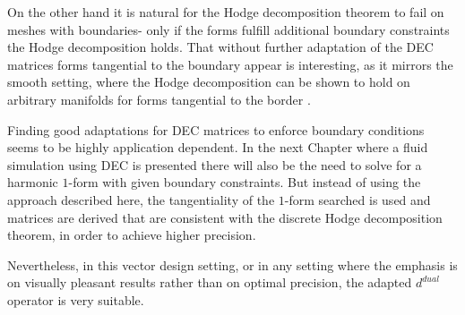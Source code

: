 On the other hand it is natural for the Hodge decomposition theorem to fail on meshes with boundaries- only if the forms fulfill additional boundary constraints the Hodge decomposition holds. That without further adaptation  of the DEC matrices forms tangential to the boundary appear is interesting, as it mirrors the smooth setting, where the Hodge decomposition can be shown to hold on arbitrary manifolds for forms tangential to the border \cite{FRANKEL11}. 

Finding good adaptations for DEC matrices to enforce boundary conditions seems to be highly application dependent.
In the next Chapter where a fluid simulation using DEC is presented there will also be the need to solve for a harmonic $1$-form with given boundary constraints. But instead of using the approach described here, the tangentiality of the $1$-form searched is used and matrices are derived that are consistent with the discrete Hodge decomposition theorem, in order to achieve higher precision.

Nevertheless, in this vector design setting, or in any setting where the emphasis is on visually pleasant results rather than on optimal precision, the adapted $d^{dual}$ operator is very suitable.
